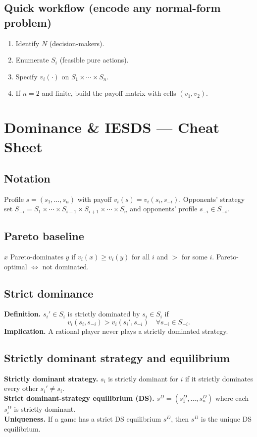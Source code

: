 \documentclass[9pt]{article}
\begin{document}
\subsection*{Quick workflow (encode any normal-form problem)}
\begin{enumerate}[label=\arabic*)]
  \item Identify $N$ (decision-makers).
  \item Enumerate $S_i$ (feasible pure actions).
  \item Specify $v_i(\cdot)$ on $S_1\times\cdots\times S_n$.
  \item If $n=2$ and finite, build the payoff matrix with cells $(v_1,v_2)$.
\end{enumerate}


\newpage
\section*{Dominance \& IESDS — Cheat Sheet}

\subsection*{Notation}
Profile $s=(s_1,\dots,s_n)$ with payoff $v_i(s)=v_i(s_i,s_{-i})$. Opponents’ strategy set $S_{-i}=S_1\times\cdots\times S_{i-1}\times S_{i+1}\times\cdots\times S_n$ and opponents’ profile $s_{-i}\in S_{-i}$.

\subsection*{Pareto baseline}
$x$ Pareto-dominates $y$ if $v_i(x)\ge v_i(y)$ for all $i$ and $>$ for some $i$. Pareto-optimal $\iff$ not dominated.

\subsection*{Strict dominance}
\textbf{Definition.} $s_i'\in S_i$ is strictly dominated by $s_i\in S_i$ if
\[
v_i(s_i,s_{-i})>v_i(s_i',s_{-i})\quad \forall s_{-i}\in S_{-i}.
\]
\textbf{Implication.} A rational player never plays a strictly dominated strategy.

\subsection*{Strictly dominant strategy and equilibrium}
\textbf{Strictly dominant strategy.} $s_i$ is strictly dominant for $i$ if it strictly dominates every other $s_i'\neq s_i$.\\
\textbf{Strict dominant-strategy equilibrium (DS).} $s^D=(s^D_1,\dots,s^D_n)$ where each $s^D_i$ is strictly dominant.\\
\textbf{Uniqueness.} If a game has a strict DS equilibrium $s^D$, then $s^D$ is the unique DS equilibrium.
\end{document}
